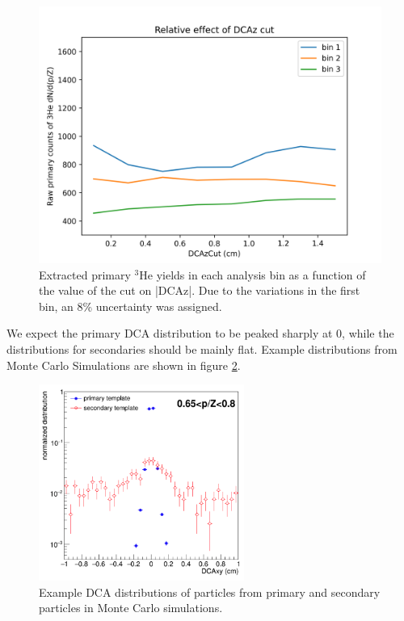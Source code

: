 \begin{figure}
    \centering
    \includegraphics[width=\textwidth]{figures/Effect_of_DCAz_cut.png}
    \caption{Extracted primary $^3\mathrm{He}$ yields in each analysis bin as a function of the value of the cut on |DCAz|. Due to the variations in the first bin, an 8\% uncertainty was assigned.}
    \label{fig:DCAzcutEffect}
\end{figure}

We expect the primary DCA distribution to be peaked sharply at 0, while the distributions for secondaries should be mainly flat. Example distributions from Monte Carlo Simulations are shown in figure \ref{fig:ExampleDCADistributions}.

\begin{figure}
    \centering
    \includegraphics[width=0.6\textwidth]{figures/Example_templates.png}
    \caption{Example DCA distributions of particles from primary and secondary particles in Monte Carlo simulations.}
    \label{fig:ExampleDCADistributions}
\end{figure}

